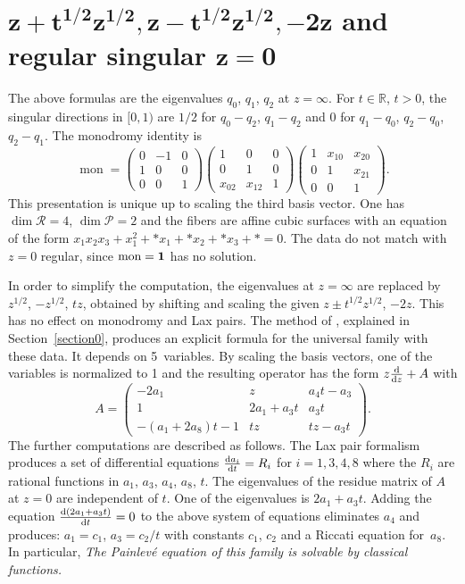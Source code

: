 \documentclass[10pt,a4paper]{amsart}
\numberwithin{equation}{section}
\begin{document}
 \section[z plus sqrt(tz), z-sqrt(tz), -2z and regular singular z=0]{$\boldsymbol{z+t^{1/2}z^{1/2}, z-t^{1/2}z^{1/2},-2z}$ and regular singular $\boldsymbol{z=0}$}\label{four}
 The above formulas are the eigenvalues $q_0$, $q_1$, $q_2$ at $z=\infty$.
For $t\in \mathbb{R}$, $t>0$, the singular directions in $[0,1)$ are $1/2$ for $q_0-q_2$, $q_1-q_2$ and $0$ for $q_1-q_0$, $q_2-q_0$, $q_2-q_1$. The monodromy identity is
\[\operatorname{mon}= \begin{pmatrix} 0 &-1 & 0\\ 1&0 &0 \\ 0 &0 &1 \end{pmatrix}
\begin{pmatrix} 1 &0 &0 \\ 0&1 &0 \\ x_{02}& x_{12}&1 \end{pmatrix}
\begin{pmatrix} 1 &x_{10} &x_{20} \\ 0&1 &x_{21} \\ 0&0 &1 \end{pmatrix}.\]
This presentation is unique up to scaling the third basis vector.
One has $\dim \mathcal{R}=4$, $\dim \mathcal{P}=2$ and the fibers are affine cubic surfaces
with an equation of the form $x_1x_2x_3+x_1^2+*x_1+*x_2+*x_3+*=0$.
The data do not match with $z=0$ regular, since $\operatorname{mon}={\bf 1}$ has no solution.

In order to simplify the computation, the eigenvalues at $z=\infty$ are replaced by $z^{1/2}$, $-z^{1/2}$, $tz$, obtained by shifting and scaling
the given $z\pm t^{1/2}z^{1/2}$, $-2z$. This has no effect on monodromy and Lax pairs.
 The method of \cite[Section~12.5]{vdP-Si}, explained in
Section~\ref{section0}, produces an explicit formula for the universal family with these data.
 It depends on 5~variables. By scaling the basis vectors, one of the variables is normalized to 1 and the resulting operator has the form
$z\frac{{\rm d}}{{\rm d}z}+ A$ with
\[ A= \begin{pmatrix} -2a_1&z& a_4t-a_3\\ 1&2a_1+a_3t & a_3t \\ -(a_1+2a_8)t-1& tz & tz-a_3t \end{pmatrix}.\]
The further computations are described as follows.
The Lax pair formalism produces a set of differential equations $\frac{{\rm d}a_i}{{\rm d}t}=R_i$ for $i=1,3,4,8$ where the $R_i$ are rational
functions in $a_1$, $a_3$, $a_4$, $a_8$, $t$. The eigenvalues of the residue matrix of $A$ at $z=0$ are independent of $t$. One of the
eigenvalues is $2a_1+a_3t$. Adding the equation $\frac{{\rm d}(2a_1+a_3t) }{{\rm d}t}=0$ to the above system of equations eliminates $a_4$
and produces: $a_1=c_1$, $a_3=c_2/t$ with constants $c_1$, $c_2$ and a Riccati equation for~$a_8$. In particular,
 {\it The Painlev\'e equation of this family is solvable by classical functions.}
\end{document}
